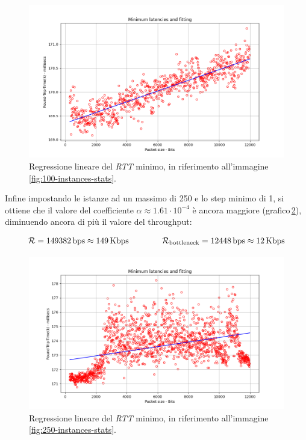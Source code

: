 \begin{figure}[h]
    \centering
    \includegraphics[width = .8\textwidth]{hw-2/report/imgs/100-instances/la-min-latencies.png}
    \caption{Regressione lineare del \textsl{RTT} minimo, in riferimento all'immagine\,\ref{fig:100-instances-stats}.}
    \label{fig:100-instances-min}
\end{figure}

\FloatBarrier\noindent Infine impostando le istanze ad un massimo di 250 e lo step minimo di 1, si ottiene che il valore del coefficiente $\alpha \approx 1.61 \cdot 10^{-4}$ è ancora maggiore (grafico\,\ref{fig:250-instances-min}), diminuendo ancora di più il valore del throughput:

\begin{gather*}
    \mathcal{R} = 149382\,\text{bps} \approx  149\,\text{Kbps}  \hspace{40px} \mathcal{R}_{\text{bottleneck}} = 12448\,\text{bps} \approx  12\,\text{Kbps}
\end{gather*}

\begin{figure}[h]
    \centering
    \includegraphics[width = .8\textwidth]{hw-2/report/imgs/250-instances/la-min-latencies.png}
    \caption{Regressione lineare del \textsl{RTT} minimo, in riferimento all'immagine\,\ref{fig:250-instances-stats}.}
    \label{fig:250-instances-min}
\end{figure}




